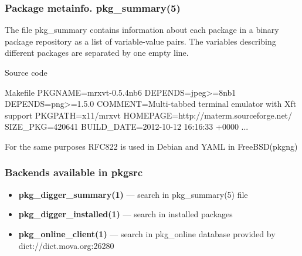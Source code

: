 \documentclass[hyperref=unicode,ascii,xcolor=dvipsnames]{beamer}
\begin{document}
\begin{frame}[fragile]
  \frametitle{Package metainfo. pkg\_summary(5)}
The file pkg\_summary
contains information about each package in a binary package
repository as a list of variable-value pairs. The variables
describing different packages are separated by one empty line.

\begin{block}{Source code}
  \begin{Code}{Makefile}
PKGNAME=mrxvt-0.5.4nb6
DEPENDS=jpeg>=8nb1
DEPENDS=png>=1.5.0
COMMENT=Multi-tabbed terminal emulator with Xft support
PKGPATH=x11/mrxvt
HOMEPAGE=http://materm.sourceforge.net/
SIZE\_PKG=420641
BUILD\_DATE=2012-10-12 16:16:33 +0000
...
  \end{Code}
\end{block}
For the same purposes RFC822 is used in Debian and YAML in FreeBSD(pkgng)
\end{frame}


\begin{frame}[fragile]
  \frametitle{Backends available in pkgsrc}
  \begin{itemize}
  \item {\bf pkg\_digger\_summary(1)} --- search in pkg\_summary(5) file
  \item {\bf pkg\_digger\_installed(1)} --- search in installed packages
  \item {\bf pkg\_online\_client(1)} --- search in pkg\_online database provided by dict://dict.mova.org:26280
  \end{itemize}
\end{frame}

\end{document}
